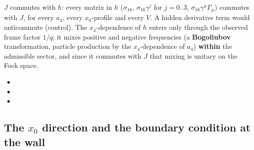 $J$ commutes with $h$: every matrix in $h$ ($\sigma_{16}$, $\sigma_{16}\gamma^j$ for $j=0..3$,
$\sigma_{16}\gamma^\mu\Gamma_\mu$) commutes with $J$, for every $a_4$, every $x_0$-profile and every
$V$. A hidden derivative term would anticommute (control). The $x_4$-dependence of $h$ enters only
through the observed frame factor $1/q$; it mixes positive and negative frequencies (a
\textbf{Bogoliubov} transformation, particle production by the $x_4$-dependence of $a_4$)
\textbf{within} the admissible sector, and since it commutes with $J$ that mixing is unitary on the
Fock space. 
\begin{itemize}
  \item {}
  \item {}
  \item {}
\end{itemize}

\subsection{The \texorpdfstring{$x_0$}{x0} direction and the boundary condition at the wall}
\label{sec:6.12}

